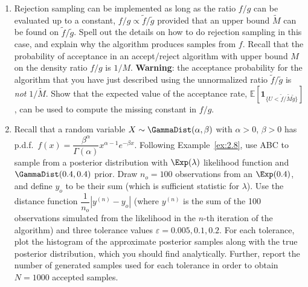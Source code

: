 \begin{enumerate}
\item[2.5] Rejection sampling can be implemented as long as the ratio $f/g$ can be evaluated
up to a constant, $f/g \propto \tilde{f}/\tilde{g}$ provided that an upper bound $\tilde{M}$ can be found on $\tilde{f}/\tilde{g}$. Spell out
the details on how to do rejection sampling in this case, and explain why the algorithm produces
samples from $f$. Recall that the probability of acceptance in an accept/reject algorithm with
upper bound $M$ on the density ratio $f/g$ is $1/M$. \textbf{Warning}: the acceptance probability for the
algorithm that you have just described using the unnormalized ratio $\tilde{f}/\tilde{g}$ is \textit{not} $1/\tilde{M}$. Show that
the expected value of the acceptance rate, $\mathbb{E}\!\left[\mathbf{1}_{\{U < \tilde{f}/\tilde{M}\tilde{g}\}}\right]$, can be used to compute the missing
constant in $f/g$.

\item[2.6] Recall that a random variable $X \sim \GammaDist(\alpha, \beta)$ with $\alpha > 0$, $\beta > 0$ has
p.d.f.\ $f(x) = \dfrac{\beta^\alpha}{\Gamma(\alpha)} x^{\alpha-1} e^{-\beta x}$. Following Example~\ref{ex:2.8}, use ABC to sample from a posterior
distribution with $\Exp(\lambda)$ likelihood function and $\GammaDist(0.4, 0.4)$ prior. Draw $n_o = 100$
observations from an $\Exp(0.4)$, and define $y_o$ to be their sum (which is sufficient statistic
for $\lambda$). Use the distance function $\dfrac{1}{n_o}|y^{(n)} - y_o|$ (where $y^{(n)}$ is the sum of the 100 observations
simulated from the likelihood in the $n$-th iteration of the algorithm) and three tolerance values
$\varepsilon = 0.005, 0.1, 0.2$. For each tolerance, plot the histogram of the approximate posterior samples
along with the true posterior distribution, which you should find analytically. Further, report the
number of generated samples used for each tolerance in order to obtain $N = 1000$ accepted
samples.

\end{enumerate}
